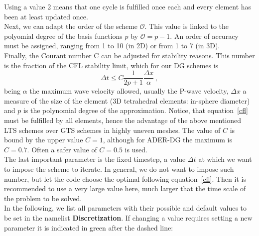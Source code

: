 \documentclass[12pt,twoside]{article}
\def\O{{\mathcal O}}
\begin{document}
Using a value 2 means that one cycle is fulfilled once each and every
element has been at least updated once.\\
Next, we can adapt the order of the scheme $\O$.
This value is linked to the polyomial degree of the basis functions $p$ by $\O=p-1$.
An order of accuracy must be assigned, ranging from 1 to 10 (in 2D) or from 1 to 7 (in 3D).\\
Finally, the Courant number C can be adjusted for stability reasons.
This number is the fraction of the CFL stability limit, which for our DG schemes is
\begin{equation}
\label{cfl}
\Delta t\leq C \frac{1}{2p+1}\frac{\Delta x}{\alpha}\,,
\end{equation}
being $\alpha$ the maximum wave velocity allowed, usually the P-wave velocity,
$\Delta x$ a measure of the size of the element (3D tetrahedral elements: in-sphere diameter)
and $p$ is the polynomial degree of the approximation.
Notice, that equation~\eqref{cfl} must be fulfilled by all elements,
hence the advantage of the above mentioned LTS schemes over GTS schemes in highly uneven meshes.
The value of $C$ is bound by the upper value $C=1$, although for ADER-DG the maximum is $C=0.7$.
Often a safer value of $C=0.5$ is used.\\
The last important parameter is the fixed timestep, a value $\Delta t$ at which we want to impose the scheme to iterate.
In general, we do not want to impose such number, but let the code choose the optimal following equation~\eqref{cfl}.
Then it is recommended to use a very large value here, much larger that the time scale of the problem to be solved.\\

In the following, we list all parameters with their possible and default values to be set in the namelist \textbf{Discretization}.
If changing a value requires setting a new parameter it is indicated in green after the dashed line:\\
\end{document}
